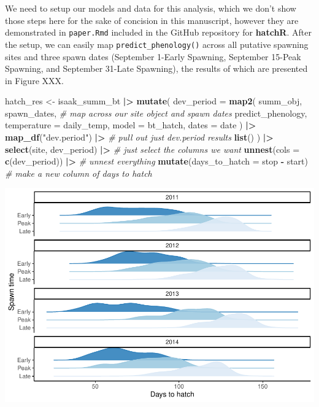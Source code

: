 \documentclass[webpdf,large,contemporary,namedate]{oup-authoring-template}
\newenvironment{Shaded}{\begin{snugshade}}{\end{snugshade}}
\newcommand{\AttributeTok}[1]{\textcolor[rgb]{0.13,0.29,0.53}{#1}}
\newcommand{\CommentTok}[1]{\textcolor[rgb]{0.56,0.35,0.01}{\textit{#1}}}
\newcommand{\FunctionTok}[1]{\textcolor[rgb]{0.13,0.29,0.53}{\textbf{#1}}}
\newcommand{\NormalTok}[1]{#1}
\newcommand{\OtherTok}[1]{\textcolor[rgb]{0.56,0.35,0.01}{#1}}
\newcommand{\SpecialCharTok}[1]{\textcolor[rgb]{0.81,0.36,0.00}{\textbf{#1}}}
\newcommand{\StringTok}[1]{\textcolor[rgb]{0.31,0.60,0.02}{#1}}
\theoremstyle{thmstyleone}
\theoremstyle{thmstyletwo}
\theoremstyle{thmstylethree}
\begin{document}
We need to setup our models and data for this analysis, which we don't
show those steps here for the sake of concision in this manuscript,
however they are demonstrated in \texttt{paper.Rmd} included in the
GitHub repository for \textbf{hatchR}. After the setup, we can easily
map \texttt{predict\_phenology()} across all putative spawning sites and
three spawn dates (September 1-Early Spawning, September 15-Peak
Spawning, and September 31-Late Spawning), the results of which are
presented in Figure XXX.

\begin{Shaded}
\begin{Highlighting}[]
\NormalTok{hatch\_res }\OtherTok{\textless{}{-}}\NormalTok{ isaak\_summ\_bt }\SpecialCharTok{|\textgreater{}} 
  \FunctionTok{mutate}\NormalTok{(}
    \AttributeTok{dev\_period =} \FunctionTok{map2}\NormalTok{(}
\NormalTok{      summ\_obj, spawn\_dates, }\CommentTok{\# map across our site object and spawn dates}
\NormalTok{      predict\_phenology,}
      \AttributeTok{temperature =}\NormalTok{ daily\_temp,}
      \AttributeTok{model =}\NormalTok{ bt\_hatch,}
      \AttributeTok{dates =}\NormalTok{ date}
\NormalTok{      ) }\SpecialCharTok{|\textgreater{}} 
      \FunctionTok{map\_df}\NormalTok{(}\StringTok{"dev.period"}\NormalTok{) }\SpecialCharTok{|\textgreater{}} \CommentTok{\# pull out just dev.period results}
      \FunctionTok{list}\NormalTok{()}
\NormalTok{    ) }\SpecialCharTok{|\textgreater{}} 
  \FunctionTok{select}\NormalTok{(site, dev\_period) }\SpecialCharTok{|\textgreater{}} \CommentTok{\# just select the columns we want}
  \FunctionTok{unnest}\NormalTok{(}\AttributeTok{cols =} \FunctionTok{c}\NormalTok{(dev\_period)) }\SpecialCharTok{|\textgreater{}} \CommentTok{\# unnest everything}
  \FunctionTok{mutate}\NormalTok{(}\AttributeTok{days\_to\_hatch =}\NormalTok{ stop }\SpecialCharTok{{-}}\NormalTok{ start) }\CommentTok{\# make a new column of days to hatch}
\end{Highlighting}
\end{Shaded}

\includegraphics[width=1\linewidth]{paper_oxford_files/figure-latex/unnamed-chunk-18-1}
\end{document}
